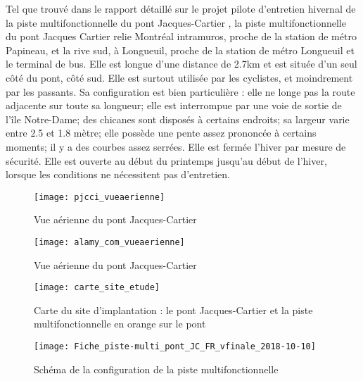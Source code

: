 ﻿\par Tel que trouvé dans le rapport détaillé sur le projet pilote d'entretien hivernal de la piste multifonctionnelle du pont Jacques-Cartier \cite{pjcci_rapport_2018}, la piste multifonctionnelle du pont Jacques Cartier relie Montréal intramuros, proche de la station de métro Papineau, et la rive sud, à Longueuil, proche de la station de métro Longueuil et le terminal de bus. Elle est longue d'une distance de 2.7km et est située d'un seul côté du pont, côté sud. Elle est surtout utilisée par les cyclistes, et moindrement par les passants. 
Sa configuration est bien particulière \cite{pjcci_fiche_2018}: elle ne longe pas la route adjacente sur toute sa longueur; elle est interrompue par une voie de sortie de l'île Notre-Dame; des chicanes sont disposés à certains endroits; sa largeur varie entre 2.5 et 1.8 mètre; elle possède une pente assez prononcée à certains moments; il y a des courbes assez serrées.
Elle est fermée l'hiver par mesure de sécurité. Elle est ouverte au début du printemps jusqu'au début de l'hiver, lorsque les conditions ne nécessitent pas d'entretien.
\label{pjcci_vueaerienne}
\begin{figure}[H]
    \centering
    \texttt{[image: pjcci\_vueaerienne]}
    \caption{Vue aérienne du pont Jacques-Cartier}
    \label{fig:pjcci_vueaerienne}
\end{figure}
\label{alamy_com_vueaerienne}
\begin{figure}[H]
    \centering
    \texttt{[image: alamy\_com\_vueaerienne]}
    \caption{Vue aérienne du pont Jacques-Cartier}
    \label{fig:alamy_com_vueaerienne}
\end{figure}
\label{carte_site_etude}
\begin{figure}[H]
    \centering
    \texttt{[image: carte\_site\_etude]}
    \caption{Carte du site d'implantation : le pont Jacques-Cartier et la piste multifonctionnelle en orange sur le pont}
    \label{fig:carte_site_etude}
\end{figure}
\label{Fiche_piste-multi_pont_JC_FR_vfinale_2018-10-10}
\begin{figure}[H]
    \centering
    \texttt{[image: Fiche\_piste-multi\_pont\_JC\_FR\_vfinale\_2018-10-10]}
    \caption{Schéma de la configuration de la piste multifonctionnelle}
    \label{fig:Fiche_piste-multi_pont_JC_FR_vfinale_2018-10-10}
\end{figure}